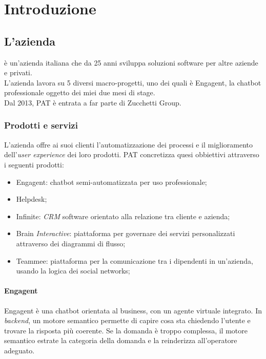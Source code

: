 
\chapter{Introduzione}
\label{cap:introduzione}
\section{L'azienda}

\company è un'azienda italiana che da 25 anni sviluppa soluzioni software per altre aziende e privati.\\
L'azienda lavora su 5 diversi macro-progetti, uno dei quali è Engagent, la chatbot professionale oggetto dei miei due mesi di stage.\\
Dal 2013, PAT è entrata a far parte di Zucchetti Group.

\subsection{Prodotti e servizi}
L'azienda offre ai suoi clienti l'automatizzazione dei processi e il miglioramento dell'\textit{user experience} dei loro prodotti.
PAT concretizza quesi obbiettivi attraverso i seguenti prodotti:
\begin{itemize}
    \item Engagent: chatbot semi-automatizzata per uso professionale; 
    \item Helpdesk;
    \item Infinite: \textit{CRM} software orientato alla relazione tra cliente e azienda;
    \item Brain \textit{Interactive}: piattaforma per governare dei servizi personalizzati attraverso dei diagrammi di flusso; 
    \item Teammee: piattaforma per la comunicazione tra i dipendenti in un'azienda, usando la logica dei social networks;
\end{itemize}

\subsubsection{Engagent}

Engagent è una chatbot orientata al business, con un agente virtuale integrato. In \textit{backend}, un motore semantico permette di capire cosa sta chiedendo l'utente e trovare la risposta più coerente. Se la domanda è troppo complessa, il motore semantico estrate la categoria della domanda e la reinderizza all'operatore adeguato.


